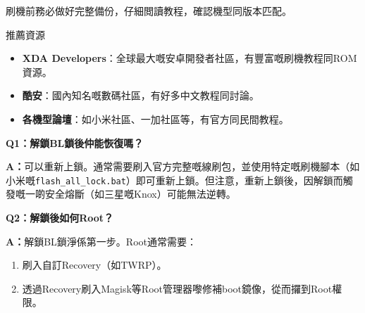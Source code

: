刷機前務必做好完整備份，仔細閲讀教程，確認機型同版本匹配。

\begin{tcbinfo}{推薦資源}
\begin{itemize}
  \item \textbf{XDA Developers}：全球最大嘅安卓開發者社區，有豐富嘅刷機教程同ROM資源。
  \item \textbf{酷安}：國內知名嘅數碼社區，有好多中文教程同討論。
  \item \textbf{各機型論壇}：如小米社區、一加社區等，有官方同民間教程。
\end{itemize}

\end{tcbinfo}


\textbf{Q1：解鎖BL鎖後仲能恢復嗎？}\par

\textbf{A：}可以重新上鎖。通常需要刷入官方完整嘅線刷包，並使用特定嘅刷機腳本（如小米嘅\texttt{flash\_all\_lock.\allowbreak bat}）即可重新上鎖。但注意，重新上鎖後，因解鎖而觸發嘅一啲安全熔斷（如三星嘅Knox）可能無法逆轉。

\textbf{Q2：解鎖後如何Root？}\par

\textbf{A：}解鎖BL鎖淨係第一步。Root通常需要：

\begin{enumerate}
  \item 刷入自訂Recovery（如TWRP）。
  \item 透過Recovery刷入Magisk等Root管理器嚟修補boot鏡像，從而攞到Root權限。
\end{enumerate}
